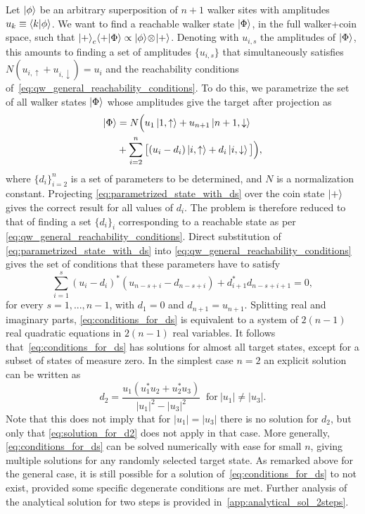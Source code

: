 Let $\ket\phi$ be an arbitrary superposition of $n+1$ walker sites with amplitudes $u_k \equiv \braket{k}{\phi}$.
We want to find a reachable walker state $\ket\Phi$, in the full walker+coin space, such that
$\ket{+}_c \!\braket{+}{\Phi} \propto \ket\phi \!\otimes\! \ket+$.
Denoting with $u_{i,s}$ the amplitudes of $\ket\Phi$, this amounts to finding a set of amplitudes $\{u_{i,s}\}$ that simultaneously satisfies
${N(u_{i,\uparrow}+u_{i,\downarrow})= u_i}$
and the reachability conditions of~\cref{eq:qw_general_reachability_conditions}.
To do this, we parametrize the set of all walker states $\ket\Phi$ whose amplitudes give the target after projection as
\begin{equation}
\begin{aligned}
	\ket\Phi &= N \Big( u_1 \ket{1,\uparrow} + u_{n+1} \ket{n+1,\downarrow} \\
	&+ \sum_{i=2}^n \big[
		(u_i - d_i) \ket{i, \uparrow} +
		d_i \ket{i, \downarrow}
	\big] \Big),
\end{aligned}
\label{eq:parametrized_state_with_ds}
\end{equation}
where $\{ d_i \}_{i=2}^n$ is a set of parameters to be determined, and $N$ is a normalization constant.
Projecting \cref{eq:parametrized_state_with_ds} over the coin state $\ket+$ gives the correct result for all values of $d_i$.
The problem is therefore reduced to that of finding a set $\{d_i\}_i$ corresponding to a reachable state as per \cref{eq:qw_general_reachability_conditions}.
Direct substitution of \cref{eq:parametrized_state_with_ds} into \cref{eq:qw_general_reachability_conditions} gives the set of conditions that these parameters have to satisfy
\begin{equation}
	\sum_{i=1}^s
	(u_i - d_i)^*
	(u_{n-s+i} - d_{n-s+i})
	+
	d_{i+1}^* d_{n-s+i+1}
	= 0,
	\label{eq:conditions_for_ds}
\end{equation}
for every $s=1,...,n-1$,
with $d_1=0$ and $d_{n+1}=u_{n+1}$.
Splitting real and imaginary parts, \cref{eq:conditions_for_ds} is equivalent to a system of $2(n-1)$ real quadratic equations in $2(n-1)$ real variables.
It follows that~\cref{eq:conditions_for_ds} has solutions for almost all target states, except for a subset of states of measure zero.
In the simplest case $n=2$ an explicit solution can be written as
\begin{equation}
	d_2 = \frac{
		u_1(u_1^* u_2 + u_2^* u_3)
	}{
		\lvert u_1 \rvert^2 - \lvert u_3 \rvert^2
	}~\text{ for}~\lvert u_1 \rvert \neq \lvert u_3 \rvert.
	\label{eq:solution_for_d2}
\end{equation}
Note that this does not imply that for $\lvert u_1 \rvert = \lvert u_3 \rvert$ there is no solution for $d_2$, but only that \cref{eq:solution_for_d2} does not apply in that case.
More generally, \cref{eq:conditions_for_ds}
can be solved numerically with ease for small $n$, giving multiple solutions for any randomly selected target state.
As remarked above for the general case, it is still possible for a solution of~\cref{eq:conditions_for_ds} to not exist, provided some specific degenerate conditions are met.
Further analysis of the analytical solution for two steps is provided in~\cref{app:analytical_sol_2steps}.

